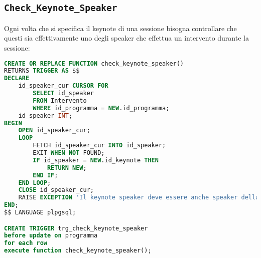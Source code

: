 \subsection{\texttt{Check\_Keynote\_Speaker}}\label{trig:check_keynote}
Ogni volta che si specifica il keynote di una sessione bisogna controllare che questi sia effettivamente uno degli speaker che effettua un intervento durante la sessione:
\begin{lstlisting}[language=SQL, caption={\texttt{Check\_Keynote\_Speaker}},style=mystyle]
CREATE OR REPLACE FUNCTION check_keynote_speaker()
RETURNS TRIGGER AS $$
DECLARE
    id_speaker_cur CURSOR FOR
        SELECT id_speaker
        FROM Intervento
        WHERE id_programma = NEW.id_programma;
    id_speaker INT;
BEGIN
    OPEN id_speaker_cur;
    LOOP
        FETCH id_speaker_cur INTO id_speaker;
        EXIT WHEN NOT FOUND;
        IF id_speaker = NEW.id_keynote THEN
            RETURN NEW;
        END IF;
    END LOOP;
    CLOSE id_speaker_cur;
    RAISE EXCEPTION 'Il keynote speaker deve essere anche speaker della sessione';
END;
$$ LANGUAGE plpgsql;

CREATE TRIGGER trg_check_keynote_speaker
before update on programma
for each row
execute function check_keynote_speaker();
\end{lstlisting}